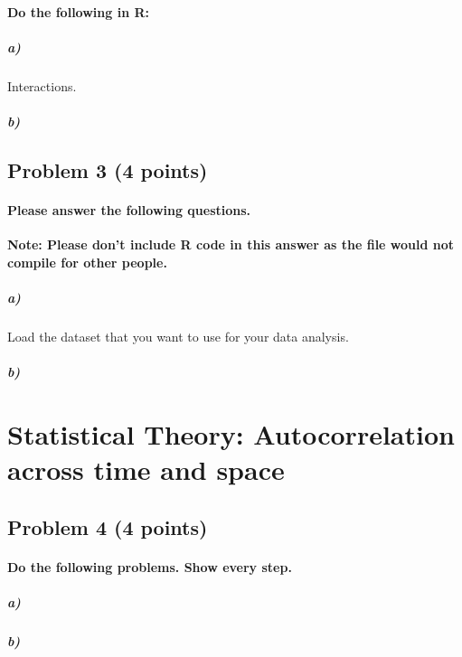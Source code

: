 \documentclass[12pt]{article}
\begin{document}
\paragraph{Do the following in R:}

\subparagraph{a)} Interactions.

\subparagraph{b)}



\subsection*{Problem 3 (4 points)}

\paragraph{Please answer the following questions.}

\textbf{Note: Please don't include R code in this answer as the file would not compile for other people.} 

\subparagraph{a)} Load the dataset that you want to use for your data analysis.

\subparagraph{b)}



\section*{Statistical Theory: Autocorrelation across time and space}

\subsection*{Problem 4 (4 points)}

\paragraph{Do the following problems. Show every step.}

\subparagraph{a)}

\subparagraph{b)}
\end{document}
